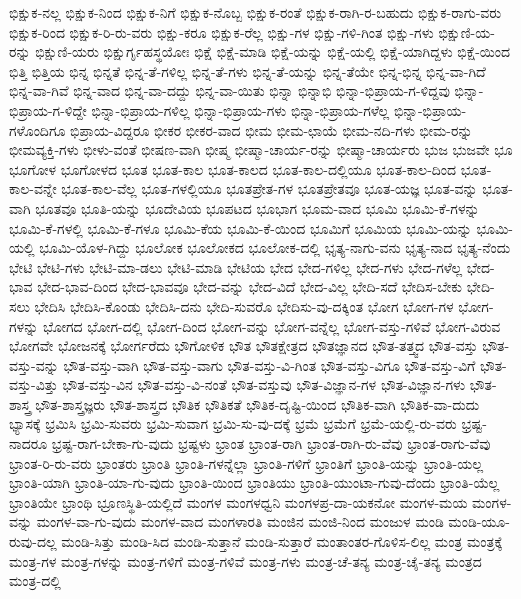 {ಭಿಕ್ಷುಕ-ನಲ್ಲ
ಭಿಕ್ಷುಕ-ನಿಂದ
ಭಿಕ್ಷುಕ-ನಿಗೆ
ಭಿಕ್ಷುಕ-ನೊಬ್ಬ
ಭಿಕ್ಷುಕ-ರಂತೆ
ಭಿಕ್ಷುಕ-ರಾಗಿ-ರ-ಬಹುದು
ಭಿಕ್ಷುಕ-ರಾಗು-ವರು
ಭಿಕ್ಷುಕ-ರಿಂದ
ಭಿಕ್ಷುಕ-ರಿ-ರು-ವರು
ಭಿಕ್ಷು-ಕರೂ
ಭಿಕ್ಷುಕ-ರೆಲ್ಲ
ಭಿಕ್ಷು-ಗಳ
ಭಿಕ್ಷು-ಗಳಿ-ಗಿಂತ
ಭಿಕ್ಷು-ಗಳು
ಭಿಕ್ಷುಣಿ-ಯ-ರನ್ನು
ಭಿಕ್ಷುಣಿ-ಯರು
ಭಿಕ್ಷುರ್ಗೃಹಸ್ಥಯೋಃ
ಭಿಕ್ಷೆ
ಭಿಕ್ಷೆ-ಮಾಡಿ
ಭಿಕ್ಷೆ-ಯನ್ನು
ಭಿಕ್ಷೆ-ಯಲ್ಲಿ
ಭಿಕ್ಷೆ-ಯಾಗಿದ್ದಳು
ಭಿಕ್ಷೆ-ಯಿಂದ
ಭಿತ್ತಿ
ಭಿತ್ತಿಯ
ಭಿನ್ನ
ಭಿನ್ನತೆ
ಭಿನ್ನ-ತೆ-ಗಳಿಲ್ಲ
ಭಿನ್ನ-ತೆ-ಗಳು
ಭಿನ್ನ-ತೆ-ಯನ್ನು
ಭಿನ್ನ-ತೆಯೇ
ಭಿನ್ನ-ಭಿನ್ನ
ಭಿನ್ನ-ವಾ-ಗಿದೆ
ಭಿನ್ನ-ವಾ-ಗಿವೆ
ಭಿನ್ನ-ವಾದ
ಭಿನ್ನ-ವಾ-ದದ್ದು
ಭಿನ್ನ-ವಾ-ಯಿತು
ಭಿನ್ನಾ
ಭಿನ್ನಾಭಿ
ಭಿನ್ನಾ-ಭಿಪ್ರಾಯ-ಗ-ಳಿದ್ದವು
ಭಿನ್ನಾ-ಭಿಪ್ರಾಯ-ಗ-ಳಿದ್ದೇ
ಭಿನ್ನಾ-ಭಿಪ್ರಾಯ-ಗಳಿಲ್ಲ
ಭಿನ್ನಾ-ಭಿಪ್ರಾಯ-ಗಳು
ಭಿನ್ನಾ-ಭಿಪ್ರಾಯ-ಗಳೆಲ್ಲ
ಭಿನ್ನಾ-ಭಿಪ್ರಾಯ-ಗಳೊಂದಿಗೂ
ಭಿಪ್ರಾಯ-ವಿದ್ದರೂ
ಭೀಕರ
ಭೀಕರ-ವಾದ
ಭೀಮ
ಭೀಮ-ಛಾಯೆ
ಭೀಮ-ನದಿ-ಗಳು
ಭೀಮ-ರನ್ನು
ಭೀಮವ್ಯಕ್ತಿ-ಗಳು
ಭೀಳು-ವಂತೆ
ಭೀಷಣ-ವಾಗಿ
ಭೀಷ್ಮ
ಭೀಷ್ಮಾ-ಚಾರ್ಯ-ರನ್ನು
ಭೀಷ್ಮಾ-ಚಾರ್ಯರು
ಭುಜ
ಭುಜವೇ
ಭೂ
ಭೂಗೋಳ
ಭೂಗೋಳದ
ಭೂತ
ಭೂತ-ಕಾಲ
ಭೂತ-ಕಾಲದ
ಭೂತ-ಕಾಲ-ದಲ್ಲಿಯೂ
ಭೂತ-ಕಾಲ-ದಿಂದ
ಭೂತ-ಕಾಲ-ವನ್ನೇ
ಭೂತ-ಕಾಲ-ವೆಲ್ಲ
ಭೂತ-ಗಳಲ್ಲಿಯೂ
ಭೂತಪ್ರೇತ-ಗಳ
ಭೂತಪ್ರೇತವೂ
ಭೂತ-ಯಜ್ಞ
ಭೂತ-ವನ್ನು
ಭೂತ-ವಾಗಿ
ಭೂತವೂ
ಭೂತಿ-ಯನ್ನು
ಭೂದೇವಿಯ
ಭೂಪಟದ
ಭೂಭಾಗ
ಭೂಮ-ವಾದ
ಭೂಮಿ
ಭೂಮಿ-ಕೆ-ಗಳನ್ನು
ಭೂಮಿ-ಕೆ-ಗಳಲ್ಲಿ
ಭೂಮಿ-ಕೆ-ಗಳೂ
ಭೂಮಿ-ಕೆಯ
ಭೂಮಿ-ಕೆ-ಯಿಂದ
ಭೂಮಿಗೆ
ಭೂಮಿಯ
ಭೂಮಿ-ಯನ್ನು
ಭೂಮಿ-ಯಲ್ಲಿ
ಭೂಮಿ-ಯೊಳ-ಗಿದ್ದು
ಭೂಲೋಕ
ಭೂಲೋಕದ
ಭೂಲೋಕ-ದಲ್ಲಿ
ಭೃತ್ಯ-ನಾಗು-ವನು
ಭೃತ್ಯ-ನಾದ
ಭೃತ್ಯ-ನೆಂದು
ಭೇಟಿ
ಭೇಟಿ-ಗಳು
ಭೇಟಿ-ಮಾ-ಡಲು
ಭೇಟಿ-ಮಾಡಿ
ಭೇಟಿಯ
ಭೇದ
ಭೇದ-ಗಳಿಲ್ಲ
ಭೇದ-ಗಳು
ಭೇದ-ಗಳೆಲ್ಲ
ಭೇದ-ಭಾವ
ಭೇದ-ಭಾವ-ದಿಂದ
ಭೇದ-ಭಾವವೂ
ಭೇದ-ವನ್ನು
ಭೇದ-ವಿದೆ
ಭೇದ-ವಿಲ್ಲ
ಭೇದಿ-ಸದೆ
ಭೇದಿಸ-ಬೇಕು
ಭೇದಿ-ಸಲು
ಭೇದಿಸಿ
ಭೇದಿಸಿ-ಕೊಂಡು
ಭೇದಿಸಿ-ದನು
ಭೇದಿ-ಸುವರೊ
ಭೇದಿಸು-ವು-ದಕ್ಕಿಂತ
ಭೋಗ
ಭೋಗ-ಗಳ
ಭೋಗ-ಗಳನ್ನು
ಭೋಗದ
ಭೋಗ-ದಲ್ಲಿ
ಭೋಗ-ದಿಂದ
ಭೋಗ-ವನ್ನು
ಭೋಗ-ವನ್ನೆಲ್ಲ
ಭೋಗ-ವಸ್ತು-ಗಳಿವೆ
ಭೋಗ-ವಿರುವ
ಭೋಗವೇ
ಭೋಜನಕ್ಕೆ
ಭೋರ್ಗರೆದು
ಭೌಗೋಳಿಕ
ಭೌತ
ಭೌತಕ್ಷೇತ್ರದ
ಭೌತಜ್ಞಾನದ
ಭೌತ-ತತ್ತ್ವದ
ಭೌತ-ವಸ್ತು
ಭೌತ-ವಸ್ತು-ವನ್ನು
ಭೌತ-ವಸ್ತು-ವಾಗಿ
ಭೌತ-ವಸ್ತು-ವಾಗು
ಭೌತ-ವಸ್ತು-ವಿ-ಗಿಂತ
ಭೌತ-ವಸ್ತು-ವಿಗೂ
ಭೌತ-ವಸ್ತು-ವಿಗೆ
ಭೌತ-ವಸ್ತು-ವಿತ್ತು
ಭೌತ-ವಸ್ತು-ವಿನ
ಭೌತ-ವಸ್ತು-ವಿ-ನಂತೆ
ಭೌತ-ವಸ್ತುವು
ಭೌತ-ವಿಜ್ಞಾನ-ಗಳ
ಭೌತ-ವಿಜ್ಞಾನ-ಗಳು
ಭೌತ-ಶಾಸ್ತ್ರ
ಭೌತ-ಶಾಸ್ತ್ರಜ್ಞರು
ಭೌತ-ಶಾಸ್ತ್ರದ
ಭೌತಿಕ
ಭೌತಿಕತೆ
ಭೌತಿಕ-ದೃಷ್ಟಿ-ಯಿಂದ
ಭೌತಿಕ-ವಾಗಿ
ಭೌತಿಕ-ವಾ-ದುದು
ಭ್ಯಾಸಕ್ಕೆ
ಭ್ರಮಿಸಿ
ಭ್ರಮಿ-ಸುವರು
ಭ್ರಮಿ-ಸುವಾಗ
ಭ್ರಮಿ-ಸು-ವು-ದಕ್ಕೆ
ಭ್ರಮೆ
ಭ್ರಮೆಗೆ
ಭ್ರಮೆ-ಯಲ್ಲಿ-ರು-ವರು
ಭ್ರಷ್ಟ-ನಾದರೂ
ಭ್ರಷ್ಟ-ರಾಗ-ಬೇಕಾ-ಗು-ವುದು
ಭ್ರಷ್ಟಳು
ಭ್ರಾಂತ
ಭ್ರಾಂತ-ರಾಗಿ
ಭ್ರಾಂತ-ರಾಗಿ-ರು-ವೆವು
ಭ್ರಾಂತ-ರಾಗು-ವೆವು
ಭ್ರಾಂತ-ರಿ-ರು-ವರು
ಭ್ರಾಂತರು
ಭ್ರಾಂತಿ
ಭ್ರಾಂತಿ-ಗಳನ್ನೆಲ್ಲಾ
ಭ್ರಾಂತಿ-ಗಳಿಗೆ
ಭ್ರಾಂತಿಗೆ
ಭ್ರಾಂತಿ-ಯನ್ನು
ಭ್ರಾಂತಿ-ಯಲ್ಲ
ಭ್ರಾಂತಿ-ಯಾಗಿ
ಭ್ರಾಂತಿ-ಯಾ-ಗು-ವುದು
ಭ್ರಾಂತಿ-ಯಿಂದ
ಭ್ರಾಂತಿಯು
ಭ್ರಾಂತಿ-ಯುಂಟಾ-ಗುವು-ದೆಂದು
ಭ್ರಾಂತಿ-ಯೆಲ್ಲ
ಭ್ರಾಂತಿಯೇ
ಭ್ರಾಂಥಿ
ಭ್ರೂಣಸ್ಥಿತಿ-ಯಲ್ಲಿದೆ
ಮಂಗಳ
ಮಂಗಳಧ್ವನಿ
ಮಂಗಳಪ್ರ-ದಾ-ಯಕನೋ
ಮಂಗಳ-ಮಯ
ಮಂಗಳ-ವನ್ನು
ಮಂಗಳ-ವಾ-ಗು-ವುದು
ಮಂಗಳ-ವಾದ
ಮಂಗಳಾರತಿ
ಮಂಜಿನ
ಮಂಜಿ-ನಿಂದ
ಮಂಜುಳ
ಮಂಡಿ
ಮಂಡಿ-ಯೂ-ರುವು-ದಲ್ಲ
ಮಂಡಿ-ಸಿತ್ತು
ಮಂಡಿ-ಸಿದ
ಮಂಡಿ-ಸುತ್ತಾನೆ
ಮಂಡಿ-ಸುತ್ತಾರೆ
ಮಂತಾಂತರ-ಗೊಳಿಸ-ಲಿಲ್ಲ
ಮಂತ್ರ
ಮಂತ್ರಕ್ಕೆ
ಮಂತ್ರ-ಗಳ
ಮಂತ್ರ-ಗಳನ್ನು
ಮಂತ್ರ-ಗಳಿಗೆ
ಮಂತ್ರ-ಗಳಿವೆ
ಮಂತ್ರ-ಗಳು
ಮಂತ್ರ-ಚೆ-ತನ್ಯ
ಮಂತ್ರ-ಚೈ-ತನ್ಯ
ಮಂತ್ರದ
ಮಂತ್ರ-ದಲ್ಲಿ
}
